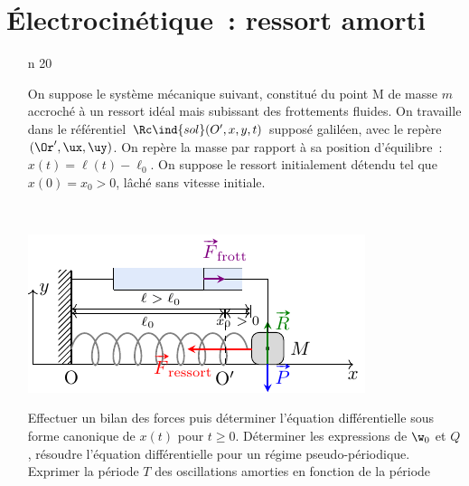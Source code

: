 \documentclass[a4paper, 10pt, final, garamond]{book}
\begin{document}
\setcounter{chapter}{5}

\chapter{Électrocinétique~: ressort amorti}

\begin{enumerate}[label=\sqenumi, leftmargin=10pt]
	\item[n]{20}
	      \noindent
	      \begin{minipage}[t]{.65\linewidth}
		      On suppose le système mécanique suivant, constitué du point M de masse $m$
		      accroché à un ressort idéal mais subissant des frottements fluides. On
		      travaille dans le référentiel $\Rc\ind{sol}(O',x,y,t)$ supposé galiléen,
		      avec le repère $(\Or', \ux, \uy)$. On repère la masse par rapport à sa
		      position d'équilibre~: $x (t) = \ell(t) - \ell_0$. On suppose le ressort
		      initialement détendu tel que $x (0) = x_0 > 0$, lâché sans vitesse initiale.
	      \end{minipage}
	      \hfill
	      \begin{minipage}[t]{.32\linewidth}
		      ~
		      \vspace{-35pt}
		      \begin{center}
			      \includegraphics[width=\linewidth]{ressort_amorti}
		      \end{center}
	      \end{minipage}
	      Effectuer un bilan des forces puis déterminer l'équation différentielle sous
	      forme canonique de $x (t)$ pour $t \geq 0$. Déterminer les expressions de
	      $\w_0$ et $Q$, résoudre l'équation différentielle pour un régime
	      pseudo-périodique.
	      \smallbreak
	      Exprimer la période $T$ des oscillations amorties en fonction de la période

\end{enumerate}
\end{document}
